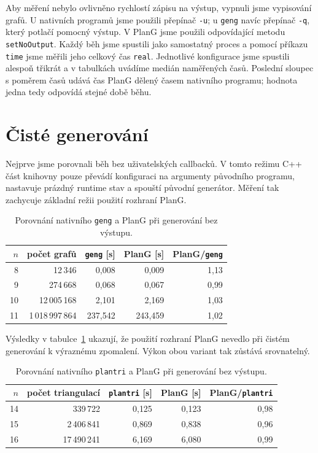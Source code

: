 Aby měření nebylo ovlivněno rychlostí zápisu na výstup, vypnuli jsme vypisování
grafů. U nativních programů jsme použili přepínač \texttt{-u}; u \texttt{geng}
navíc přepínač \texttt{-q}, který potlačí pomocný výstup. V PlanG jsme použili
odpovídající metodu \texttt{setNoOutput}. Každý běh jsme spustili jako
samostatný proces a pomocí příkazu \texttt{time} jsme měřili jeho celkový čas
\texttt{real}. Jednotlivé konfigurace jsme spustili alespoň třikrát a v
tabulkách uvádíme medián naměřených časů. Poslední sloupec s poměrem časů
udává čas PlanG dělený časem nativního programu; hodnota jedna tedy odpovídá
stejné době běhu.

\section{Čisté generování}
\label{sec:evaluation-baseline}

Nejprve jsme porovnali běh bez uživatelských callbacků. V tomto režimu C++ část
knihovny pouze převádí konfiguraci na argumenty původního programu, nastavuje
prázdný runtime stav a spouští původní generátor. Měření tak zachycuje základní
režii použití rozhraní PlanG.

\begin{table}[htbp]
\centering
\begin{tabular}{rrrrr}
\toprule
\(n\) & počet grafů & \texttt{geng} [s] & PlanG [s] & PlanG/\texttt{geng} \\
\midrule
8  & 12\,346           & 0{,}008   & 0{,}009   & 1{,}13 \\
9  & 274\,668          & 0{,}068   & 0{,}067   & 0{,}99 \\
10 & 12\,005\,168     & 2{,}101   & 2{,}169   & 1{,}03 \\
11 & 1\,018\,997\,864 & 237{,}542 & 243{,}459 & 1{,}02 \\
\bottomrule
\end{tabular}
\caption{Porovnání nativního \texttt{geng} a PlanG při generování bez výstupu.}
\label{tab:evaluation-geng-baseline}
\end{table}

Výsledky v tabulce~\ref{tab:evaluation-geng-baseline} ukazují, že použití
rozhraní PlanG nevedlo při čistém generování k výraznému zpomalení. Výkon obou
variant tak zůstává srovnatelný.

\begin{table}[htbp]
\centering
\begin{tabular}{rrrrr}
\toprule
\(n\) & počet triangulací & \texttt{plantri} [s] & PlanG [s] & PlanG/\texttt{plantri} \\
\midrule
14 & 339\,722     & 0{,}125 & 0{,}123 & 0{,}98 \\
15 & 2\,406\,841  & 0{,}869 & 0{,}838 & 0{,}96 \\
16 & 17\,490\,241 & 6{,}169 & 6{,}080 & 0{,}99 \\
\bottomrule
\end{tabular}
\caption{Porovnání nativního \texttt{plantri} a PlanG při generování bez výstupu.}
\label{tab:evaluation-plantri-baseline}
\end{table}

